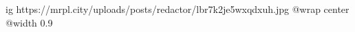  
 
 
 
 

\ifcmt
  ig https://mrpl.city/uploads/posts/redactor/lbr7k2je5wxqdxuh.jpg
  @wrap center
  @width 0.9
\fi

